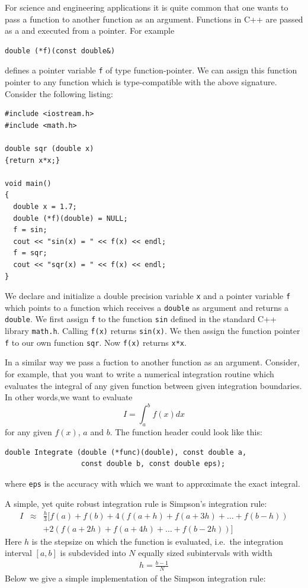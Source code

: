 For science and engineering applications it is quite common that one wants to
pass a function to another function as an argument. Functions in C++ are
passed as a and executed from a pointer. For example
{\small \begin{verbatim}
double (*f)(const double&)
\end{verbatim}}
\noindent
defines a pointer variable \verb+f+ of type function-pointer. We can assign
this function pointer to any function which is type-compatible with the
above signature. Consider the following listing:
{\small \begin{verbatim}
#include <iostream.h>
#include <math.h>

double sqr (double x)
{return x*x;}

void main()
{
  double x = 1.7;
  double (*f)(double) = NULL;
  f = sin;
  cout << "sin(x) = " << f(x) << endl;
  f = sqr;
  cout << "sqr(x) = " << f(x) << endl;
}
\end{verbatim}}
\noindent
We declare and initialize a double precision variable \verb+x+ and a pointer variable
\verb+f+ which points to a function which receives a \verb+double+ as argument and
returns a \verb+double+. We first assign \verb+f+ to the function \verb+sin+ defined
in the standard C++ library \verb+math.h+. Calling \verb+f(x)+ returns \verb+sin(x)+.
We then assign the function pointer \verb+f+ to our own function \verb+sqr+. Now
\verb+f(x)+ returns \verb+x*x+.

In a similar way we pass a fuction to another function as an argument. Consider, for
example, that you want to write a numerical integration routine which evaluates the
integral of any given function between given integration boundaries. In other
words,we want to evaluate
\begin{equation}
  I = \int_a^b f(x) dx \nonumber
\end{equation}
for any given $f(x)$, $a$ and $b$. The function header could look like this:
{\small \begin{verbatim}
double Integrate (double (*func)(double), const double a,
                  const double b, const double eps);
\end{verbatim}}
\noindent
where \verb+eps+ is the accuracy with which we want to approximate the exact integral.

A simple, yet quite robust integration rule is Simpson's integration rule:
\begin{eqnarray}
  I & \approx & \frac{h}{3} [f(a)+f(b)+4(f(a+h) + f(a+3h) + \dots + f(b-h))
       \nonumber \\
    &  & + 2(f(a+2h)+f(a+4h)+ \dots +f(b-2h))] \nonumber
\end{eqnarray}
Here $h$ is the stepsize on which the function is evaluated, i.e.\ the integration
interval $[a,b]$ is subdevided into $N$ equally sized subintervals with width
\begin{eqnarray}
  h = \frac{b-1}{N} \nonumber
\end{eqnarray}
Below we give a simple implementation of the Simpson integration rule:

